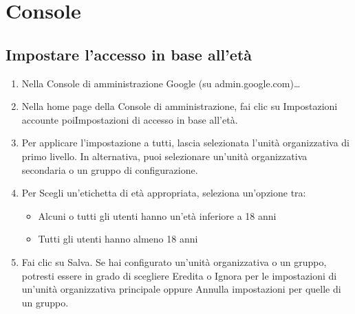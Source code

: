 
\chapter{Console}
\section{Impostare l'accesso in base all'età}
\begin{enumerate}
\item 	Nella Console di amministrazione Google (su admin.google.com)…
\item 	Nella home page della Console di amministrazione, fai clic su Impostazioni accounte poiImpostazioni di accesso in base all'età.
\item 	Per applicare l'impostazione a tutti, lascia selezionata l'unità organizzativa di primo livello. In alternativa, puoi selezionare un'unità organizzativa secondaria o un gruppo di configurazione.
\item 	Per Scegli un'etichetta di età appropriata, seleziona un'opzione tra:
\begin{itemize}
	\item Alcuni o tutti gli utenti hanno un'età inferiore a 18 anni
	\item Tutti gli utenti hanno almeno 18 anni
\end{itemize}
\item 	Fai clic su Salva. Se hai configurato un'unità organizzativa o un gruppo, potresti essere in grado di scegliere Eredita o Ignora per le impostazioni di un'unità organizzativa principale oppure Annulla impostazioni per quelle di un gruppo.
\end{enumerate}
